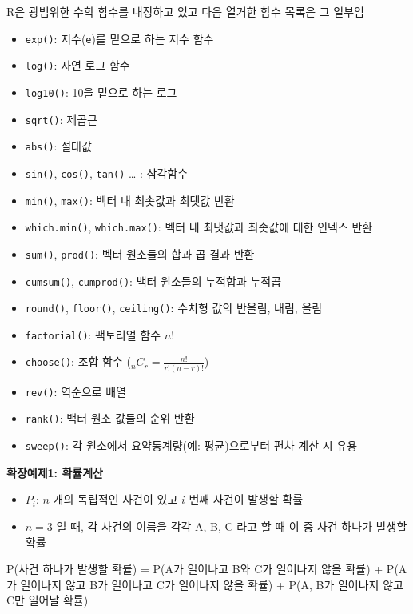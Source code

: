 \documentclass[
  11pt,
]{krantz}
\newenvironment{Shaded}{\begin{snugshade}}{\end{snugshade}}
\newcommand{\FunctionTok}[1]{\textcolor[rgb]{0,0,0}{#1}}
\newcommand{\NormalTok}[1]{#1}
\newcommand{\OtherTok}[1]{\textcolor[rgb]{0.37,0.37,0.37}{#1}}
\newcommand{\SpecialCharTok}[1]{\textcolor[rgb]{0,0,0}{#1}}
\providecommand{\tightlist}{%
  \setlength{\itemsep}{0pt}\setlength{\parskip}{0pt}}
\begin{document}
R은 광범위한 수학 함수를 내장하고 있고 다음 열거한 함수 목록은 그 일부임

\begin{itemize}
\tightlist
\item
  \texttt{exp()}: 지수(\texttt{e})를 밑으로 하는 지수 함수
\item
  \texttt{log()}: 자연 로그 함수
\item
  \texttt{log10()}: 10을 밑으로 하는 로그
\item
  \texttt{sqrt()}: 제곱근
\item
  \texttt{abs()}: 절대값
\item
  \texttt{sin()}, \texttt{cos()}, \texttt{tan()} \ldots{} : 삼각함수
\item
  \texttt{min()}, \texttt{max()}: 벡터 내 최솟값과 최댓값 반환
\item
  \texttt{which.min()}, \texttt{which.max()}: 벡터 내 최댓값과 최솟값에 대한 인덱스 반환
\item
  \texttt{sum()}, \texttt{prod()}: 벡터 원소들의 합과 곱 결과 반환
\item
  \texttt{cumsum()}, \texttt{cumprod()}: 백터 원소들의 누적합과 누적곱
\item
  \texttt{round()}, \texttt{floor()}, \texttt{ceiling()}: 수치형 값의 반올림, 내림, 올림
\item
  \texttt{factorial()}: 팩토리얼 함수 \(n!\)
\item
  \texttt{choose()}: 조합 함수 (\(_n C_r = \frac{n!}{r!(n-r)!}\))
\item
  \texttt{rev()}: 역순으로 배열
\item
  \texttt{rank()}: 백터 원소 값들의 순위 반환
\item
  \texttt{sweep()}: 각 원소에서 요약통계량(예: 평균)으로부터 편차 계산 시 유용
\end{itemize}

\textbf{확장예제1: 확률계산}

\begin{itemize}
\tightlist
\item
  \(P_i\): \(n\) 개의 독립적인 사건이 있고 \(i\) 번째 사건이 발생할 확률
\item
  \(n = 3\) 일 때, 각 사건의 이름을 각각 A, B, C 라고 할 때 이 중 사건 하나가 발생할 확률
\end{itemize}

\footnotesize

\begin{Shaded}
\begin{Highlighting}[]
\FunctionTok{P}\NormalTok{(사건 하나가 발생할 확률) }\OtherTok{=} 
\FunctionTok{P}\NormalTok{(A가 일어나고 B와 C가 일어나지 않을 확률) }\SpecialCharTok{+} 
  \FunctionTok{P}\NormalTok{(A가 일어나지 않고 B가 일어나고 C가 일어나지 않을 확률) }\SpecialCharTok{+} 
  \FunctionTok{P}\NormalTok{(A, B가 일어나지 않고 C만 일어날 확률)}
\end{Highlighting}
\end{Shaded}
\end{document}
